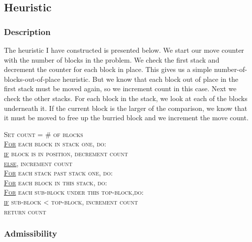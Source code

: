 \documentclass{article}
\begin{document}
\subsection{Heuristic}
\subsubsection{Description}

The heuristic I have constructed is presented below.
We start our move counter with the number of blocks in the problem. We check the
first stack and decrement the counter for each block in place. This gives us a
simple number-of-blocks-out-of-place heuristic. But we know that each block out
of place in the first stack must be moved again, so we increment count in this
case. Next we check the other stacks. For each block in the stack, we look at
each of the blocks underneath it. If the current block is the larger of the
comparison, we know that it must be moved to free up the burried block and we
increment the move count.

\hspace*{1cm}\textsc{Set count = \# of blocks}\\
\hspace*{1cm}\textsc{\underline{For} each block in stack one, do:}\\
\hspace*{2cm}\textsc{\underline{if} block is in position, decrement count}\\
\hspace*{2cm}\textsc{\underline{else}, increment count}\\
\hspace*{1cm}\textsc{\underline{For} each stack past stack one, do:}\\
\hspace*{2cm}\textsc{\underline{For} each block in this stack, do:}\\
\hspace*{3cm}\textsc{\underline{For} each sub-block under this top-block,do:}\\
\hspace*{4cm}\textsc{\underline{if} sub-block < top-block, increment count}\\
\hspace*{1cm}\textsc{return count}



\subsubsection{Admissibility}
\end{document}
